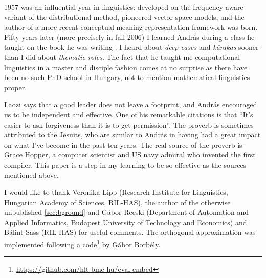 \documentclass[11pt]{article}
\begin{document}
1957 was an influential year in linguistics: \cite{Harris:1957} developed on the
frequency-aware variant of the distributional method, \cite{Osgood:1957}
pioneered vector space models, and the author of a more recent conceptual
meaning representation framework \citep{Kornai:2010,Kornai:2017} was born.
Fifty years later (more precisely in fall 2006) I learned András during a class
he taught on the book he was writing \citep{Kornai:2007}. I heard about
\emph{deep cases} and \emph{k\={a}rakas} sooner than I did about \emph{thematic
roles}. The fact that he taught me computational linguistics in a master and
disciple fashion comes at no surprise as there have been no such PhD school in
Hungary, not to mention mathematical linguistics proper.

Laozi says that a good leader does not leave a footprint, and András encouraged
us to be independent and effective. One of his remarkable citations is that
``It's easier to ask forgiveness than it is to get permission''. The proverb is
sometimes attributed to the Jesuits, who are similar to András in having had a
great impact on what I've become in the past ten years. The real source of the
proverb is Grace Hopper, a computer scientist and US navy admiral who invented
the first compiler.
This paper is a step in my learning to be so effective as the sources
mentioned above.

\bigskip

I would like to thank Veronika Lipp (Research Institute for Linguistics,
Hungarian Academy of Sciences, RIL-HAS), the author of the otherwise
unpublished \cref{sec:bground} and Gábor Recski (Department of Automation and
Applied Informatics, Budapest University of Technology and Economics) and
Bálint Sass (RIL-HAS) for useful comments. The orthogonal approximation was
implemented following a
code\footnote{\url{https://github.com/hlt-bme-hu/eval-embed}} by Gábor Borbély.



\end{document}
